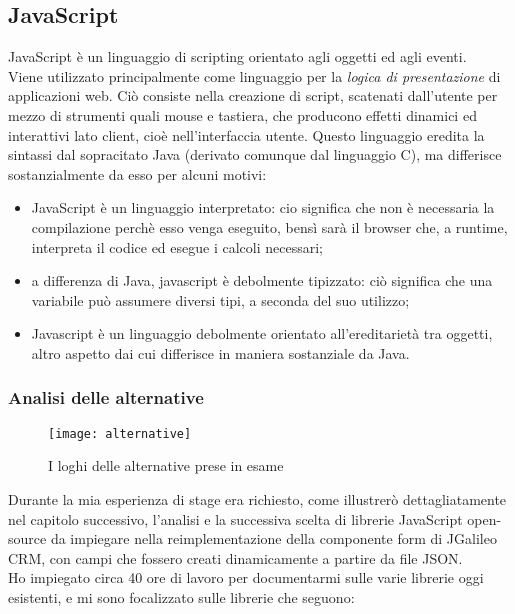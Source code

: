 \subsection{JavaScript}
JavaScript è un linguaggio di scripting orientato agli oggetti ed agli eventi.\\
Viene utilizzato principalmente come linguaggio per la \emph{logica di presentazione} di applicazioni web. Ciò consiste nella creazione di \gls{script}, scatenati dall'utente per mezzo di strumenti quali mouse e tastiera, che producono effetti dinamici ed interattivi lato client, cioè nell'interfaccia utente.
Questo linguaggio eredita la sintassi dal sopracitato Java (derivato comunque dal linguaggio C), ma differisce sostanzialmente da esso per alcuni motivi:
\begin{itemize}
	\item JavaScript è un linguaggio interpretato: cio significa che non è necessaria la compilazione perchè esso venga eseguito, bensì sarà il browser che, a runtime, interpreta il codice ed esegue i calcoli necessari;
	\item a differenza di Java, javascript è debolmente tipizzato: ciò significa che una variabile può assumere diversi tipi, a seconda del suo utilizzo;
	\item Javascript è un linguaggio debolmente orientato all'ereditarietà tra oggetti, altro aspetto dai cui differisce in maniera sostanziale da Java. 
\end{itemize}
\subsubsection{Analisi delle alternative}

\begin{figure}[h]
	\centering
	\texttt{[image: alternative]}
	\caption{I loghi delle alternative prese in esame}
\end{figure}

Durante la mia esperienza di stage era richiesto, come illustrerò dettagliatamente nel capitolo successivo, l'analisi e la successiva scelta di librerie JavaScript open-source da impiegare nella reimplementazione della componente form di JGalileo CRM, con campi che fossero creati dinamicamente a partire da file JSON. \\ 
Ho impiegato circa 40 ore di lavoro per documentarmi sulle varie librerie oggi esistenti, e mi sono focalizzato sulle librerie che seguono:

